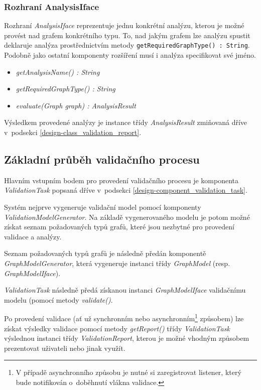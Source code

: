 \subsubsection{Rozhraní AnalysisIface}
Rozhraní \emph{AnalysisIface} reprezentuje jednu konkrétní analýzu, kterou je možné provést nad grafem konkrétního typu. To, nad jakým grafem lze analýzu spustit deklaruje analýza prostřednictvím metody \verb-getRequiredGraphType() : String-. Podobně jako ostatní komponenty rozšíření musí i analýza specifikovat své jméno.

\begin{itemize}
\item \emph{getAnalysisName() : String}
\item \emph{getRequiredGraphType() : String}
\item \emph{evaluate(Graph graph) : AnalysisResult}
\end{itemize}

Výsledkem provedené analýzy je instance třídy \emph{AnalysisResult} zmiňovaná dříve v~podsekci \ref{design-class_validation_report}.

\subsection{Základní průběh validačního procesu}
Hlavním vstupním bodem pro provedení validačního procesu je komponenta \emph{ValidationTask} popsaná dříve v~podsekci \ref{design-component_validation_task}.

Systém nejprve vygeneruje validační model pomocí komponenty \emph{ValidationModelGenerator}. Na základě vygenerovaného modelu je potom možné získat seznam požadovaných typů grafů, které jsou nezbytné pro provedení validace a analýzy.

Seznam požadovaných typů grafů je následně předán komponentě \emph{GraphModelGenerator}, která vygeneruje instanci třídy \emph{GraphModel} (resp. \emph{GraphModelIface}).

\emph{ValidationTask} následně předá získanou instanci \emph{GraphModelIface} validačnímu modelu (pomocí metody \emph{validate()}.

Po provedení validace (ať už synchronním nebo asynchronním\footnote{V případě asynchronního způsobu je nutné si zaregistrovat listener, který bude notifikován o~doběhnutí vlákna validace.} způsobem) lze získat výsledky validace pomocí metody \emph{getReport()} třídy \emph{ValidationTask} výslednou instanci třídy \emph{ValidationReport}, kterou je možné vhodným způsobem prezentovat uživateli nebo jinak využít.

